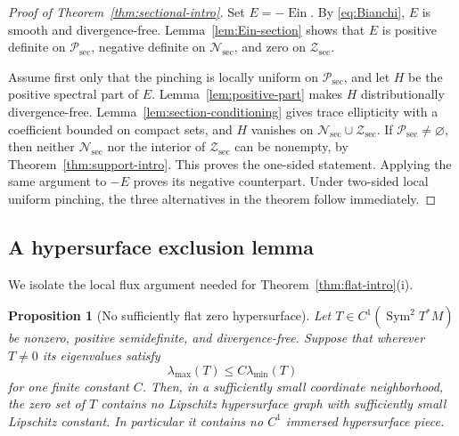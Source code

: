 \documentclass[11pt,reqno]{amsart}
\newtheorem{proposition}[theorem]{Proposition}
\theoremstyle{definition}
\theoremstyle{remark}
\newcommand{\Ein}{\operatorname{Ein}}
\newcommand{\cP}{\mathcal P}
\newcommand{\cN}{\mathcal N}
\newcommand{\cZ}{\mathcal Z}
\begin{document}
\begin{proof}[Proof of Theorem~\ref{thm:sectional-intro}]
Set $E=-\Ein$.  By \eqref{eq:Bianchi}, $E$ is smooth and divergence-free.  Lemma~\ref{lem:Ein-section} shows that $E$ is positive definite on $\cP_{\mathrm{sec}}$, negative definite on $\cN_{\mathrm{sec}}$, and zero on $\cZ_{\mathrm{sec}}$.

Assume first only that the pinching is locally uniform on $\cP_{\mathrm{sec}}$, and let $H$ be the positive spectral part of $E$.  Lemma~\ref{lem:positive-part} makes $H$ distributionally divergence-free.  Lemma~\ref{lem:section-conditioning} gives trace ellipticity with a coefficient bounded on compact sets, and $H$ vanishes on $\cN_{\mathrm{sec}}\cup\cZ_{\mathrm{sec}}$.  If $\cP_{\mathrm{sec}}\ne\varnothing$, then neither $\cN_{\mathrm{sec}}$ nor the interior of $\cZ_{\mathrm{sec}}$ can be nonempty, by Theorem~\ref{thm:support-intro}.  This proves the one-sided statement.  Applying the same argument to $-E$ proves its negative counterpart.  Under two-sided local uniform pinching, the three alternatives in the theorem follow immediately.
\end{proof}

\subsection{A hypersurface exclusion lemma}

We isolate the local flux argument needed for Theorem~\ref{thm:flat-intro}(i).

\begin{proposition}[No sufficiently flat zero hypersurface]\label{prop:no-graph}
Let $T\in C^1(\operatorname{Sym}^2T^*M)$ be nonzero, positive semidefinite, and divergence-free.  Suppose that wherever $T\ne0$ its eigenvalues satisfy
\begin{equation}\label{eq:cond-T}
\lambda_{\max}(T)\le C\lambda_{\min}(T)
\end{equation}
for one finite constant $C$.  Then, in a sufficiently small coordinate neighborhood, the zero set of $T$ contains no Lipschitz hypersurface graph with sufficiently small Lipschitz constant.  In particular it contains no $C^1$ immersed hypersurface piece.
\end{proposition}
\end{document}

